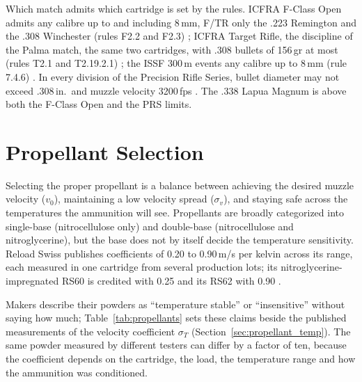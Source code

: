 \documentclass[11pt,twoside,openright]{report}
\begin{document}
Which match admits which cartridge is set by the rules. ICFRA F-Class Open admits any calibre up to and including 8\,mm, F/TR only the .223 Remington and the .308 Winchester (rules F2.2 and F2.3) \citep{icfra2023fclass}; ICFRA Target Rifle, the discipline of the Palma match, the same two cartridges, with .308 bullets of 156\,gr at most (rules T2.1 and T2.19.2.1) \citep{icfra2024tr}; the ISSF 300\,m events any calibre up to 8\,mm (rule 7.4.6) \citep{issf2026rifle}. In every division of the Precision Rifle Series, bullet diameter may not exceed .308\,in.\ and muzzle velocity 3200\,fps \citep{amrifleman2018prs}. The .338 Lapua Magnum is above both the F-Class Open and the PRS limits.

\section{Propellant Selection}

Selecting the proper propellant is a balance between achieving the desired muzzle velocity ($v_0$), maintaining a low velocity spread ($\sigma_v$), and staying safe across the temperatures the ammunition will see. Propellants are broadly categorized into single-base (nitrocellulose only) and double-base (nitrocellulose and nitroglycerine), but the base does not by itself decide the temperature sensitivity. Reload Swiss publishes coefficients of 0.20 to 0.90\,m/s per kelvin across its range, each measured in one cartridge from several production lots; its nitroglycerine-impregnated RS60 is credited with 0.25 and its RS62 with 0.90 \citep{reloadswiss2019temp}.

Makers describe their powders as ``temperature stable'' or ``insensitive'' without saying how much; Table~\ref{tab:propellants} sets these claims beside the published measurements of the velocity coefficient $\sigma_T$ (Section~\ref{sec:propellant_temp}). The same powder measured by different testers can differ by a factor of ten, because the coefficient depends on the cartridge, the load, the temperature range and how the ammunition was conditioned.
\end{document}
